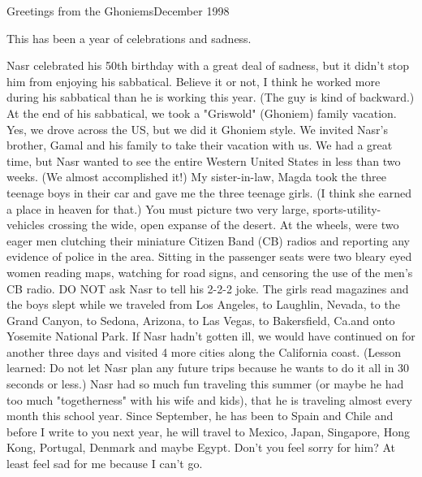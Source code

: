 
%

Greetings from the Ghoniems\hfill December 1998

This has been a year of celebrations and sadness.

Nasr celebrated his 50th birthday with a great deal of sadness, but it didn't stop him from enjoying his sabbatical. Believe it or not, I think
he worked more during his sabbatical than he is working this year. (The guy is kind of backward.) At the end of his sabbatical, we took a
"Griswold" (Ghoniem) family vacation. Yes, we drove across the US, but we did it Ghoniem style. We invited Nasr's brother, Gamal and his family
to take their vacation with us. We had a great time, but Nasr wanted to see the entire Western United States in less than two weeks. (We almost
accomplished it!) My sister-in-law, Magda took the three teenage boys in their car and gave me the three teenage girls. (I think she earned a
place in heaven for that.) You must picture two very large, sports-utility-vehicles crossing the wide, open expanse of the desert. At the
wheels, were two eager men clutching their miniature Citizen Band (CB) radios and reporting any evidence of police in the area. Sitting in the
passenger seats were two bleary eyed women reading maps, watching for road signs, and censoring the use of the men's CB radio. DO NOT ask Nasr
to tell his 2-2-2 joke. The girls read magazines and the boys slept while we traveled from Los Angeles, to Laughlin, Nevada, to the Grand
Canyon, to Sedona, Arizona, to Las Vegas, to Bakersfield, Ca.and onto Yosemite National Park. If Nasr hadn't gotten ill, we would have continued
on for another three days and visited 4 more cities along the California coast. (Lesson learned: Do not let Nasr plan any future trips because
he wants to do it all in 30 seconds or less.) Nasr had so much fun traveling this summer (or maybe he had too much "togetherness" with his wife
and kids), that he is traveling almost every month this school year. Since September, he has been to Spain and Chile and before I write to you
next year, he will travel to Mexico, Japan, Singapore, Hong Kong, Portugal, Denmark and maybe Egypt. Don't you feel sorry for him? At least feel
sad for me because I can't go.

